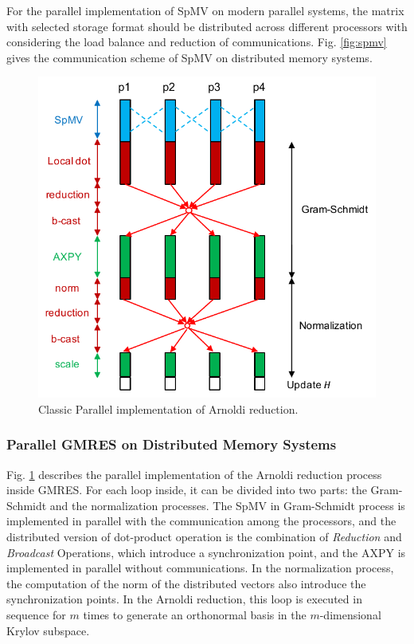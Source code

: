 {For the parallel implementation of SpMV on modern parallel systems, the matrix with selected storage format should be distributed across different processors with considering the load balance and reduction of communications. Fig. \ref{fig:spmv} gives the communication scheme of SpMV on distributed memory systems.

\begin{figure}[h]
	\centering
	\includegraphics[width=5.4in]{fig/parallel_gmres.pdf}
	\caption{Classic Parallel implementation of Arnoldi reduction.}
	\label{parallel_gmres}
\end{figure}

\subsubsection{Parallel GMRES on Distributed Memory Systems}

Fig. \ref{parallel_gmres} describes the parallel implementation of the Arnoldi reduction process inside GMRES.  For each loop inside, it can be divided into two parts: the Gram-Schmidt and the normalization processes. The SpMV in Gram-Schmidt process is implemented in parallel with the communication among the processors, and the distributed version of dot-product operation is the combination of \textit{Reduction} and \textit{Broadcast} Operations, which introduce a synchronization point, and the AXPY is implemented in parallel without communications. In the normalization process, the computation of the norm of the distributed vectors also introduce the synchronization points. In the Arnoldi reduction, this loop is executed in sequence for $m$ times to generate an orthonormal basis in the $m$-dimensional Krylov subspace.

}
